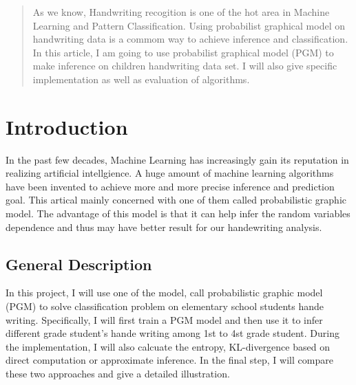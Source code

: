 \documentclass{article}
\begin{document}
 


\begin{abstract} 
As we know, Handwriting recogition is one of the hot area in Machine Learning and
Pattern Classification. Using probabilist graphical model on handwriting
data is a commom way to achieve inference and classification.
In this article, I am going to use probabilist graphical model (PGM) to make
inference on children handwriting data set. I will also give specific implementation
as well as evaluation of algorithms.
\end{abstract} 

\section{Introduction}
In the past few decades, Machine Learning has increasingly gain its reputation in realizing
artificial intellgience. A huge amount of machine learning algorithms have been invented to
achieve more and more precise inference and prediction goal. This artical mainly concerned
with one of them called probabilistic graphic model. The advantage of this model is that it
can help infer the random variables dependence and thus may have better result for our 
handewriting analysis.
\subsection{General Description}
In this project, I will use one of the model, call probabilistic graphic model (PGM) to
solve classification problem on elementary school students hande writing. Specifically,
I will first train a PGM model and then use it to infer different grade student's hande writing
among 1st to 4st grade student. During the implementation, I will also calcuate the entropy,
KL-divergence based on direct computation or approximate inference.
In the final step, I will compare these two approaches and give a detailed illustration.
\end{document}
